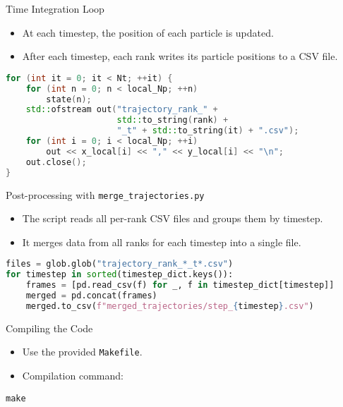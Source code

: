 \documentclass{beamer}
\begin{document}
\begin{frame}[fragile]{Time Integration Loop}
\begin{itemize}
  \item At each timestep, the position of each particle is updated.
  \item After each timestep, each rank writes its particle positions to a CSV file.
\end{itemize}
\begin{minipage}{\linewidth}\begin{lstlisting}[language=C++]
for (int it = 0; it < Nt; ++it) {
    for (int n = 0; n < local_Np; ++n)
        state(n);
    std::ofstream out("trajectory_rank_" +
                      std::to_string(rank) +
                      "_t" + std::to_string(it) + ".csv");
    for (int i = 0; i < local_Np; ++i)
        out << x_local[i] << "," << y_local[i] << "\n";
    out.close();
}
\end{lstlisting}\end{minipage}
\end{frame}

\begin{frame}[fragile]{Post-processing with \texttt{merge\_trajectories.py}}
\begin{itemize}
  \item The script reads all per-rank CSV files and groups them by timestep.
  \item It merges data from all ranks for each timestep into a single file.
\end{itemize}
\begin{minipage}{\linewidth}\begin{lstlisting}[language=Python]
files = glob.glob("trajectory_rank_*_t*.csv")
for timestep in sorted(timestep_dict.keys()):
    frames = [pd.read_csv(f) for _, f in timestep_dict[timestep]]
    merged = pd.concat(frames)
    merged.to_csv(f"merged_trajectories/step_{timestep}.csv")
\end{lstlisting}\end{minipage}
\end{frame}

\begin{frame}[fragile]{Compiling the Code}
\begin{itemize}
  \item Use the provided \texttt{Makefile}.
  \item Compilation command:
\end{itemize}
\begin{minipage}{\linewidth}\begin{lstlisting}
make
\end{lstlisting}\end{minipage}
\end{frame}
\end{document}
